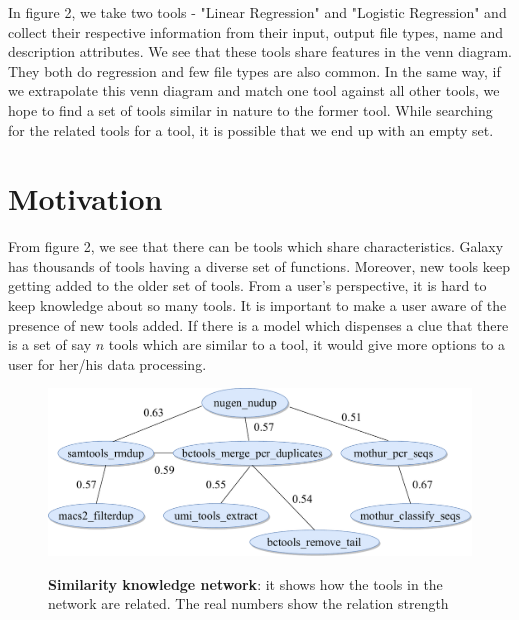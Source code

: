 In figure 2, we take two tools - "Linear Regression" and "Logistic Regression" and collect their respective information from their input, output file types, name and description attributes. We see that these tools share features in the venn diagram. They both do regression and few file types are also common. In the same way, if we extrapolate this venn diagram and match one tool against all other tools, we hope to find a set of tools similar in nature to the former tool. While searching for the related tools for a tool, it is possible that we end up with an empty set.

\section{Motivation}
From figure 2, we see that there can be tools which share characteristics. Galaxy has thousands of tools having a diverse set of functions. Moreover, new tools keep getting added to the older set of tools. From a user's perspective, it is hard to keep knowledge about so many tools. It is important to make a user aware of the presence of new tools added. If there is a model which dispenses a clue that there is a set of say $n$ tools which are similar to a tool, it would give more options to a user for her/his data processing. 

\begin{figure}[h]
\begin{centering}
    {\includegraphics[scale=0.6]{figures/tools_sim_know_graph.pdf}}
    \caption[Similarity knowledge network]{\textbf{Similarity knowledge network}: it shows how the tools in the network are related. The real numbers show the relation strength}
\end{centering}
\end{figure}

